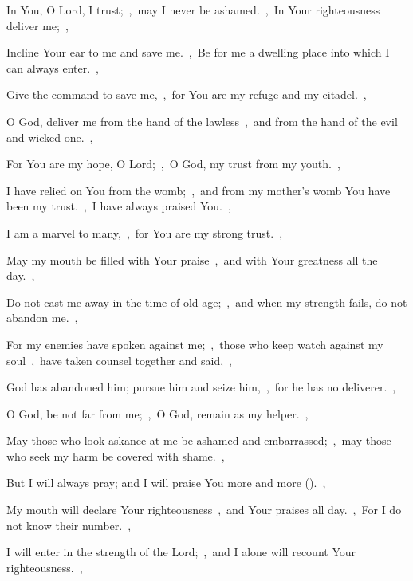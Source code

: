 \documentclass[12pt,twoside,a5paper]{article}
\begin{document}


\begin{normalparskip}
  In You, O Lord, I trust;~\sep\ may I never be ashamed.~\sep\ In Your righteousness deliver me;~\sep


  Incline Your ear to me and save me.~\sep\ Be for me a dwelling place into which I can always enter.~\sep

  Give the command to save me,~\sep\ for You are my refuge and my citadel.~\sep

  O God, deliver me from the hand of the lawless~\sep\ and from the hand of the evil and wicked one.~\sep

  For You are my hope, O Lord;~\sep\ O God, my trust from my youth.~\sep

  I have relied on You from the womb;~\sep\ and from my mother's womb You have been my trust.~\sep\ I have always praised You.~\sep

  I am a marvel to many,~\sep\ for You are my strong trust.~\sep

  May my mouth be filled with Your praise~\sep\ and with Your greatness all the day.~\sep

  Do not cast me away in the time of old age;~\sep\ and when my strength fails, do not abandon me.~\sep

  For my enemies have spoken against me;~\sep\ those who keep watch against my soul~\sep\ have taken counsel together and said,~\sep

  God has abandoned him; pursue him and seize him,~\sep\ for he has no deliverer.~\sep

  O God, be not far from me;~\sep\ O God, remain as my helper.~\sep

  May those who look askance at me be ashamed and embarrassed;~\sep\ may those who seek my harm be covered with shame.~\sep

  But I will always pray; and I will praise You more and more ().~\sep

  My mouth will declare Your righteousness~\sep\ and Your praises all day.~\sep\ For I do not know their number.~\sep

  I will enter in the strength of the Lord;~\sep\ and I alone will recount Your righteousness.~\sep


\end{normalparskip}
\end{document}
